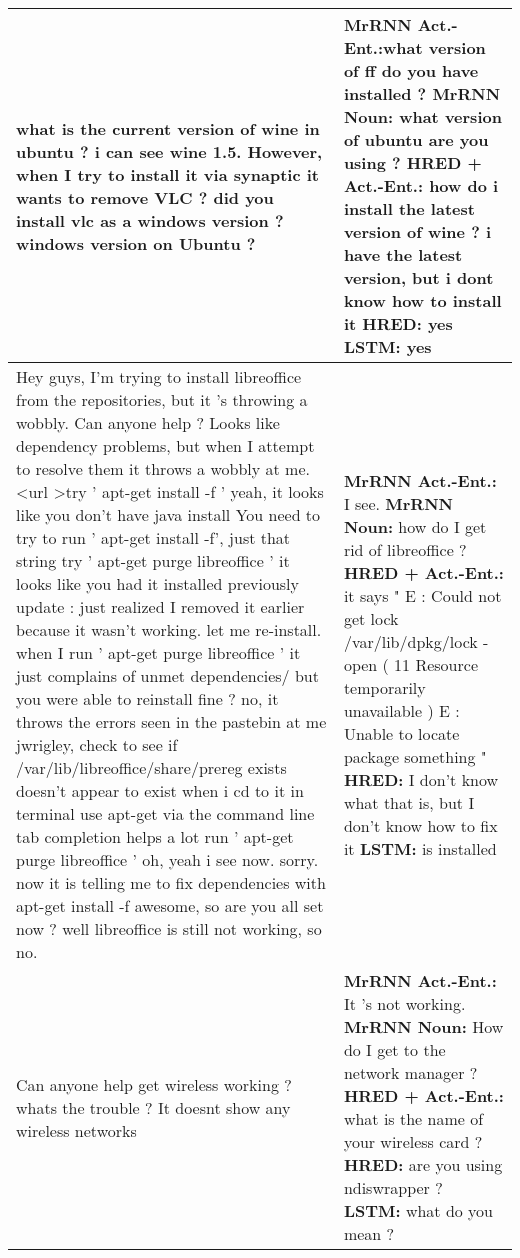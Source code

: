 \documentclass{article}
\begin{document}
\begin{table}[ht]
\begin{tabular}{p{65mm}|p{60mm}}
        what is the current version of wine in ubuntu ? i can see wine 1.5. However, when I try to install it via synaptic it wants to remove VLC ?  did you install vlc as a windows version ?  windows version on Ubuntu ? & \textbf{MrRNN Act.\@ -Ent.\@:}what version of ff do you have installed ? \newline \textbf{MrRNN Noun:} what version of ubuntu are you using ? \newline \textbf{HRED + Act.\@-Ent.\@:} how do i install the latest version of wine ? i have the latest version, but i dont know how to install it \newline \textbf{HRED:} yes \newline \textbf{LSTM:} yes \\ \hline 
        Hey guys, I'm trying to install libreoffice from the repositories, but it 's throwing a wobbly. Can anyone help ? Looks like dependency problems, but when I attempt to resolve them it throws a wobbly at me. \textless url \textgreater  try ' apt-get install -f ' yeah, it looks like you don't have java install You need to try to run ' apt-get install -f', just that string try ' apt-get purge libreoffice ' it looks like you had it installed previously  update : just realized I removed it earlier because it wasn't working. let me re-install. when I run ' apt-get purge libreoffice ' it just complains of unmet dependencies/  but you were able to reinstall fine ?  no, it throws the errors seen in the pastebin at me  jwrigley, check to see if /var/lib/libreoffice/share/prereg exists  doesn't appear to exist when i cd to it in terminal  use apt-get via the command line tab completion helps a lot run ' apt-get purge libreoffice '  oh, yeah i see now. sorry. now it is telling me to fix dependencies with apt-get install -f  awesome, so are you all set now ?  well libreoffice is still not working, so no. & \textbf{MrRNN Act.\@ -Ent.\@:} I see. \newline \textbf{MrRNN Noun:} how do I get rid of libreoffice ? \newline \textbf{HRED + Act.\@-Ent.\@:} it says " E : Could not get lock /var/lib/dpkg/lock - open ( 11 Resource temporarily unavailable ) E : Unable to locate package something " \newline \textbf{HRED:} I don't know what that is, but I don't know how to fix it \newline \textbf{LSTM:} is installed \\ \hline 
        Can anyone help get wireless working ?  whats the trouble ?  It doesnt show any wireless networks & \textbf{MrRNN Act.\@ -Ent.\@:} It 's not working. \newline \textbf{MrRNN Noun:} How do I get to the network manager ? \newline \textbf{HRED + Act.\@-Ent.\@:} what is the name of your wireless card ? \newline \textbf{HRED:} are you using ndiswrapper ? \newline \textbf{LSTM:} what do you mean ? \\ \hline 

\end{tabular}
\end{table}
\end{document}
